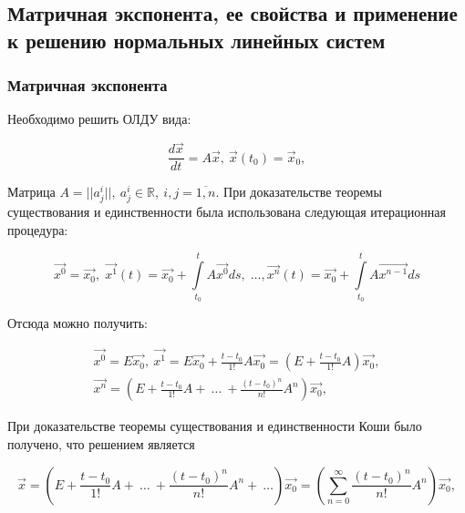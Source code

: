 \subsection{Матричная экспонента, ее свойства и применение к решению нормальных линейных систем}

\subsubsection{Матричная экспонента}
Необходимо решить ОЛДУ вида:

\begin{equation}
  	\frac{d\overrightarrow{x}}{dt} = A\overrightarrow{x},\ \overrightarrow{x}(t_0) = \overrightarrow{x}_0,
  	\label{Issue5_1}
\end{equation}

Матрица $A = ||a_j^i||,\ a_j^i \in \mathds{R},\ i, j = \overline{1,n}$. При доказательстве теоремы существования и единственности была использована следующая итерационная процедура:

\begin{equation*}
	\overrightarrow{x^{0}} = \overrightarrow{x_{0}}, \; \overrightarrow{x^{1}}(t) = \overrightarrow{x_{0}} + \int \limits_{t_0}^{t} A \overrightarrow{x^{0}} ds, \; \dots, \overrightarrow{x^{n}}(t) = \overrightarrow{x_{0}} + \int \limits_{t_0}^{t} A \overrightarrow{x^{n - 1}} ds
\end{equation*}

Отсюда можно получить:

\begin{equation*}
\begin{gathered}
         \overrightarrow{x^{0}} = E\overrightarrow{x_0},\ \overrightarrow{x^1} = E\overrightarrow{x_0} + \frac{t-t_0}{1!}A\overrightarrow{x_0} = \left(E + \frac{t-t_0}{1!}A\right) \overrightarrow{x_0}, \\  
         \overrightarrow{x^n} = \left(E + \frac{t-t_0}{1!}A +\ \dots\ + \frac{(t-t_0)^n}{n!}A^n\right)\overrightarrow{x_0},	 
\end{gathered}
\end{equation*}

При доказательстве теоремы существования и единственности Коши было получено, что решением является

\begin{equation*}
   	\overrightarrow{x} = \left(E + \frac{t-t_0}{1!}A +\ \dots\ + \frac{(t-t_0)^n}{n!}A^n+\ \dots \right)\overrightarrow{x_0} = \left(\sum\limits_{n = 0}^{\infty} \frac{(t-t_0)^n}{n!}A^n\right)\overrightarrow{x_0},	 
\end{equation*}

